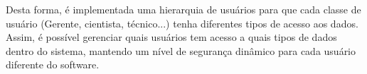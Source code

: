 
Desta forma, é implementada uma hierarquia de usuários para que cada classe de usuário (Gerente, cientista, técnico...) tenha diferentes tipos de acesso aos dados. Assim, é possível gerenciar quais usuários tem acesso a quais tipos de dados dentro do sistema, mantendo um nível de segurança dinâmico para cada usuário diferente do software.







